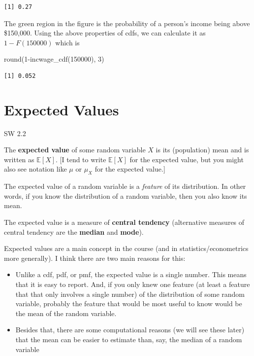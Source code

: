 \documentclass[
  letterpaper,
  DIV=11,
  numbers=noendperiod]{scrreprt}
\newenvironment{Shaded}{\begin{snugshade}}{\end{snugshade}}
\newcommand{\DecValTok}[1]{\textcolor[rgb]{0.68,0.00,0.00}{#1}}
\newcommand{\FunctionTok}[1]{\textcolor[rgb]{0.28,0.35,0.67}{#1}}
\newcommand{\NormalTok}[1]{\textcolor[rgb]{0.00,0.23,0.31}{#1}}
\newcommand{\SpecialCharTok}[1]{\textcolor[rgb]{0.37,0.37,0.37}{#1}}
\begin{document}
\begin{verbatim}
[1] 0.27
\end{verbatim}

The green region in the figure is the probability of a person's income
being above \$150,000. Using the above properties of cdfs, we can
calculate it as \(1-F(150000)\) which is

\begin{Shaded}
\begin{Highlighting}[]
\FunctionTok{round}\NormalTok{(}\DecValTok{1}\SpecialCharTok{{-}}\FunctionTok{incwage\_cdf}\NormalTok{(}\DecValTok{150000}\NormalTok{), }\DecValTok{3}\NormalTok{)}
\end{Highlighting}
\end{Shaded}

\begin{verbatim}
[1] 0.052
\end{verbatim}

\section{Expected Values}\label{expected-values}

SW 2.2

The \textbf{expected value} of some random variable \(X\) is its
(population) mean and is written as \(\mathbb{E}[X]\). {[}I tend to
write \(\mathbb{E}[X]\) for the expected value, but you might also see
notation like \(\mu\) or \(\mu_X\) for the expected value.{]}

The expected value of a random variable is a \emph{feature} of its
distribution. In other words, if you know the distribution of a random
variable, then you also know its mean.

The expected value is a measure of \textbf{central tendency}
(alternative measures of central tendency are the \textbf{median} and
\textbf{mode}).

Expected values are a main concept in the course (and in
statistics/econometrics more generally). I think there are two main
reasons for this:

\begin{itemize}
\item
  Unlike a cdf, pdf, or pmf, the expected value is a single number. This
  means that it is easy to report. And, if you only knew one feature (at
  least a feature that that only involves a single number) of the
  distribution of some random variable, probably the feature that would
  be most useful to know would be the mean of the random variable.
\item
  Besides that, there are some computational reasons (we will see these
  later) that the mean can be easier to estimate than, say, the median
  of a random variable
\end{itemize}
\end{document}
